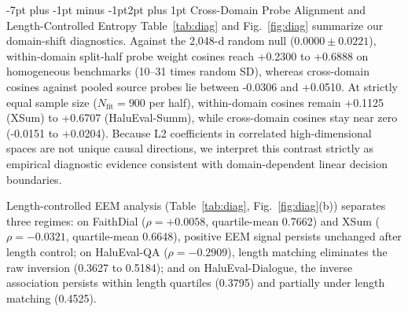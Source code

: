 \documentclass[10pt,twocolumn,letterpaper]{article}
\makeatletter
\renewcommand{\subsection}{\@startsection{subsection}{2}{\z@}%
  {-7pt plus -1pt minus -1pt}{2pt plus 1pt}%
  {\normalfont\normalsize\itshape\color{black}}}
\makeatother
\begin{document}
\subsection{Cross-Domain Probe Alignment and Length-Controlled Entropy}
Table~\ref{tab:diag} and Fig.~\ref{fig:diag} summarize our domain-shift diagnostics. Against the 2,048-d random null ($0.0000 \pm 0.0221$), within-domain split-half probe weight cosines reach +0.2300 to +0.6888 on homogeneous benchmarks (10--31 times random SD), whereas cross-domain cosines against pooled source probes lie between -0.0306 and +0.0510. At strictly equal sample size ($N_{\text{fit}} = 900$ per half), within-domain cosines remain +0.1125 (XSum) to +0.6707 (HaluEval-Summ), while cross-domain cosines stay near zero (-0.0151 to +0.0204). Because L2 coefficients in correlated high-dimensional spaces are not unique causal directions, we interpret this contrast strictly as empirical diagnostic evidence consistent with domain-dependent linear decision boundaries.

Length-controlled EEM analysis (Table~\ref{tab:diag}, Fig.~\ref{fig:diag}(b)) separates three regimes: on FaithDial ($\rho = +0.0058$, quartile-mean 0.7662) and XSum ($\rho = -0.0321$, quartile-mean 0.6648), positive EEM signal persists unchanged after length control; on HaluEval-QA ($\rho = -0.2909$), length matching eliminates the raw inversion (0.3627 to 0.5184); and on HaluEval-Dialogue, the inverse association persists within length quartiles (0.3795) and partially under length matching (0.4525).
\end{document}
